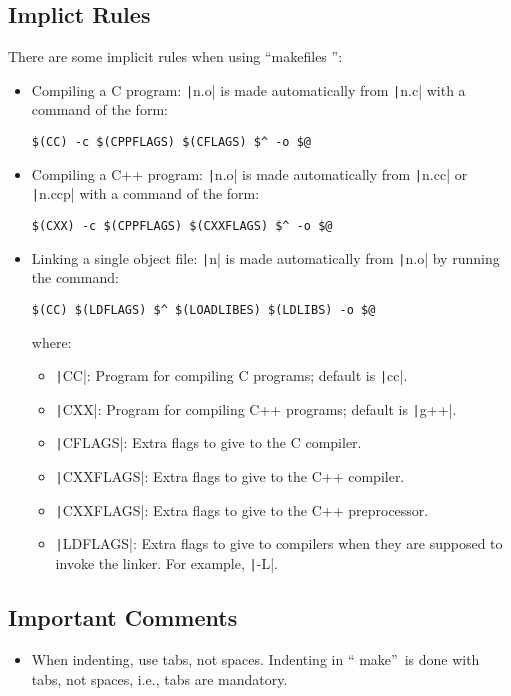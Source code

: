 \subsection{Implict Rules}
There are some implicit rules when using \textquotedblleft makefiles 
\textquotedblright:
\begin{itemize}
    \item Compiling a C program: \texttt|n.o| is made automatically
    from \texttt|n.c| with a command of the form:
    \begin{verbatim}
$(CC) -c $(CPPFLAGS) $(CFLAGS) $^ -o $@
    \end{verbatim}
    \item Compiling a C++ program: \texttt|n.o| is made automatically
    from \texttt|n.cc| or \texttt|n.ccp| with a command of
    the form:
    \begin{verbatim}
$(CXX) -c $(CPPFLAGS) $(CXXFLAGS) $^ -o $@
    \end{verbatim}
    \item Linking a single object file: \texttt|n| is made
    automatically from \texttt|n.o| by running the command:
    \begin{verbatim}
$(CC) $(LDFLAGS) $^ $(LOADLIBES) $(LDLIBS) -o $@
    \end{verbatim}
    where:
    \begin{itemize}
        \item \texttt|CC|: Program for compiling C programs; default
        is \texttt|cc|.
        \item \texttt|CXX|: Program for compiling C++ programs;
        default is \texttt|g++|.
        \item \texttt|CFLAGS|: Extra flags to give to the C compiler.
        \item \texttt|CXXFLAGS|: Extra flags to give to the C++
        compiler.
        \item \texttt|CXXFLAGS|: Extra flags to give to the C++
        preprocessor.
        \item \texttt|LDFLAGS|: Extra flags to give to compilers when
        they are supposed to invoke the linker. For example,
        \texttt|-L|. 
    \end{itemize}
\end{itemize}

\subsection{Important Comments}
\begin{itemize}
    \item When indenting, use tabs, not spaces. Indenting in \textquotedblleft
    make\textquotedblright\ is done with tabs, not spaces, i.e., tabs are
    mandatory.
\end{itemize}
